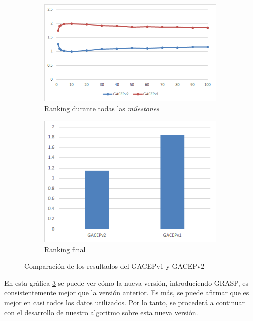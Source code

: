 \begin{figure}[h]
     \centering
     \begin{subfigure}[b]{0.45\textwidth}
         \centering
         \includegraphics[width=\textwidth]{imagenes/Experimental/GRASPvswoGRASP.png}
         \caption{Ranking durante todas las \textit{milestones}}
         \label{fig:AGEUvsGACEPv1_lineas}
     \end{subfigure}
     \hfill
     \begin{subfigure}[b]{0.45\textwidth}
         \centering
         \includegraphics[width=\textwidth]{imagenes/Experimental/barras/GRASPvswoGRASP.png}
         \caption{Ranking final}
         \label{fig:AGEUvsGACEPv1_barras}
     \end{subfigure}
        \caption{Comparación de los resultados del GACEPv1 y GACEPv2}
        \label{fig:AGEUvsGACEPv1}
\end{figure}

En esta gráfica \ref{fig:AGEUvsGACEPv1} se puede ver cómo la nueva versión, introduciendo GRASP, es consistentemente mejor que la versión anterior. 
Es más, se puede afirmar que es mejor en casi todos los datos utilizados. 
Por lo tanto, se procederá a continuar con el desarrollo de nuestro algoritmo sobre esta nueva versión.

